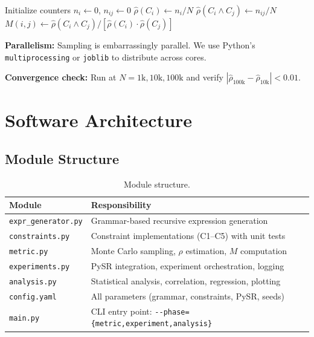 \documentclass[11pt,a4paper]{article}
\begin{document}
\begin{algorithm}[H]
\SetAlgoLined
{}
Initialize counters $n_i \gets 0$, $n_{ij} \gets 0$\;
$\hat{\rho}(C_i) \gets n_i / N$\;
$\hat{\rho}(C_i \wedge C_j) \gets n_{ij} / N$\;
$M(i,j) \gets \hat{\rho}(C_i \wedge C_j) / [\hat{\rho}(C_i) \cdot \hat{\rho}(C_j)]$\;
\caption{Monte Carlo Constraint Density Estimation}
\label{alg:montecarlo}
\end{algorithm}

\textbf{Parallelism:} Sampling is embarrassingly parallel. We use Python's \texttt{multiprocessing} or \texttt{joblib} to distribute across cores.

\textbf{Convergence check:} Run at $N = 1\text{k}, 10\text{k}, 100\text{k}$ and verify $|\hat{\rho}_{100\text{k}} - \hat{\rho}_{10\text{k}}| < 0.01$.

\section{Software Architecture}
\label{sec:architecture}

\subsection{Module Structure}
\begin{table}[h]
\centering\small
\begin{tabularx}{\textwidth}{lX}
\toprule
\textbf{Module} & \textbf{Responsibility} \\
\midrule
\texttt{expr\_generator.py} & Grammar-based recursive expression generation \\
\texttt{constraints.py} & Constraint implementations (C1--C5) with unit tests \\
\texttt{metric.py} & Monte Carlo sampling, $\rho$ estimation, $M$ computation \\
\texttt{experiments.py} & PySR integration, experiment orchestration, logging \\
\texttt{analysis.py} & Statistical analysis, correlation, regression, plotting \\
\texttt{config.yaml} & All parameters (grammar, constraints, PySR, seeds) \\
\texttt{main.py} & CLI entry point: \texttt{-{}-phase=\{metric,experiment,analysis\}} \\
\bottomrule
\end{tabularx}
\caption{Module structure.}
\end{table}
\end{document}
